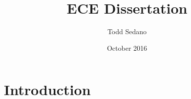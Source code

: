 \documentclass{article}
\title{ECE Dissertation}
\author{Todd Sedano}
\date{October 2016}
\begin{document}
\maketitle

\section{Introduction}
\end{document}
